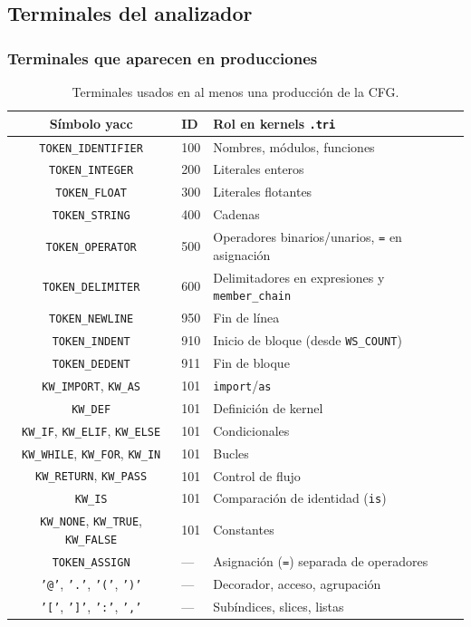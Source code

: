 \subsection{Terminales del analizador}
\label{sub:terminales-cfg}

\subsubsection{Terminales que aparecen en producciones}
\begin{table}[H]
\centering
\caption{Terminales usados en al menos una producción de la CFG.}
\label{tab:terminales-cfg}
\scriptsize
\begin{tabular}{@{}clp{5.5cm}@{}}
\toprule
\textbf{Símbolo yacc} & \textbf{ID} & \textbf{Rol en kernels \texttt{.tri}} \\
\midrule
\texttt{TOKEN\_IDENTIFIER} & 100 & Nombres, módulos, funciones \\
\texttt{TOKEN\_INTEGER} & 200 & Literales enteros \\
\texttt{TOKEN\_FLOAT} & 300 & Literales flotantes \\
\texttt{TOKEN\_STRING} & 400 & Cadenas \\
\texttt{TOKEN\_OPERATOR} & 500 & Operadores binarios/unarios, \texttt{=} en asignación \\
\texttt{TOKEN\_DELIMITER} & 600 & Delimitadores en expresiones y \texttt{member\_chain} \\
\texttt{TOKEN\_NEWLINE} & 950 & Fin de línea \\
\texttt{TOKEN\_INDENT} & 910 & Inicio de bloque (desde \texttt{WS\_COUNT}) \\
\texttt{TOKEN\_DEDENT} & 911 & Fin de bloque \\
\texttt{KW\_IMPORT}, \texttt{KW\_AS} & 101 & \texttt{import}/\texttt{as} \\
\texttt{KW\_DEF} & 101 & Definición de kernel \\
\texttt{KW\_IF}, \texttt{KW\_ELIF}, \texttt{KW\_ELSE} & 101 & Condicionales \\
\texttt{KW\_WHILE}, \texttt{KW\_FOR}, \texttt{KW\_IN} & 101 & Bucles \\
\texttt{KW\_RETURN}, \texttt{KW\_PASS} & 101 & Control de flujo \\
\texttt{KW\_IS} & 101 & Comparación de identidad (\texttt{is}) \\
\texttt{KW\_NONE}, \texttt{KW\_TRUE}, \texttt{KW\_FALSE} & 101 & Constantes \\
\texttt{TOKEN\_ASSIGN} & --- & Asignación (\texttt{=}) separada de operadores \\
\texttt{'@'}, \texttt{'.'}, \texttt{'('}, \texttt{')'} & --- & Decorador, acceso, agrupación \\
\texttt{'['}, \texttt{']'}, \texttt{':'}, \texttt{','} & --- & Subíndices, slices, listas \\
\bottomrule
\end{tabular}
\end{table}

